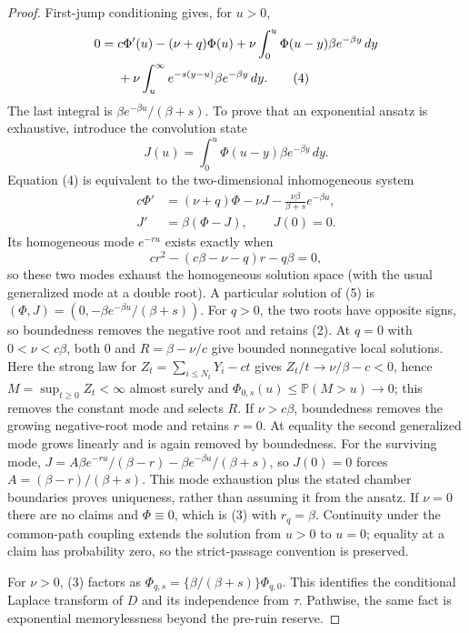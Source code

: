 \documentclass[10pt]{article}
\newcommand{\Pp}{\mathbb P}
\begin{document}
\begin{proof}
First-jump conditioning gives, for $u>0$,
\begin{align}
0={}&c\Phi'(u)-(\nu+q)\Phi(u)
+\nu\int_0^u\Phi(u-y)\beta e^{-\beta y}\,dy \notag\\
&+\nu\int_u^\infty e^{-s(y-u)}\beta e^{-\beta y}\,dy. \tag{4}
\end{align}
The last integral is $\beta e^{-\beta u}/(\beta+s)$.  To prove that an
exponential ansatz is exhaustive, introduce the convolution state
\[
 J(u)=\int_0^u\Phi(u-y)\beta e^{-\beta y}\,dy.
\]
Equation (4) is equivalent to the two-dimensional inhomogeneous system
\begin{equation}
 \begin{aligned}
 c\Phi'&=(\nu+q)\Phi-\nu J
 -\frac{\nu\beta}{\beta+s}e^{-\beta u},\\
 J'&=\beta(\Phi-J),\qquad J(0)=0.
 \end{aligned} \tag{5}
\end{equation}
Its homogeneous mode $e^{-ru}$ exists exactly when
\begin{equation}
 cr^2-(c\beta-\nu-q)r-q\beta=0, \tag{6}
\end{equation}
so these two modes exhaust the homogeneous solution space (with the usual
generalized mode at a double root).  A particular solution of (5) is
$(\Phi,J)=(0,-\beta e^{-\beta u}/(\beta+s))$.  For $q>0$, the two roots have
opposite signs, so boundedness removes the negative root and retains (2).  At
$q=0$ with $0<\nu<c\beta$, both $0$ and
$R=\beta-\nu/c$ give bounded nonnegative local solutions.  Here the strong
law for $Z_t=\sum_{i\leq N_t}Y_i-ct$ gives
$Z_t/t\to\nu/\beta-c<0$, hence $M=\sup_{t\geq0}Z_t<\infty$ almost surely and
$\Phi_{0,s}(u)\leq\Pp(M>u)\to0$; this removes the constant mode and selects
$R$.  If $\nu>c\beta$, boundedness removes the growing negative-root mode and
retains $r=0$.  At equality the second generalized mode grows linearly and is
again removed by boundedness.  For the surviving mode,
$J=A\beta e^{-ru}/(\beta-r)-\beta e^{-\beta u}/(\beta+s)$, so $J(0)=0$
forces $A=(\beta-r)/(\beta+s)$.  This mode exhaustion plus the stated chamber
boundaries proves uniqueness, rather than assuming it from the ansatz.  If
$\nu=0$ there are no claims and $\Phi\equiv0$,
which is (3) with $r_q=\beta$.  Continuity under the common-path coupling
extends the solution from $u>0$ to $u=0$; equality at a claim has probability
zero, so the strict-passage convention is preserved.

For $\nu>0$, (3) factors as
$\Phi_{q,s}=\{\beta/(\beta+s)\}\Phi_{q,0}$.  This identifies the conditional
Laplace transform of $D$ and its independence from $\tau$.  Pathwise, the same
fact is exponential memorylessness beyond the pre-ruin reserve.
\end{proof}
\end{document}
